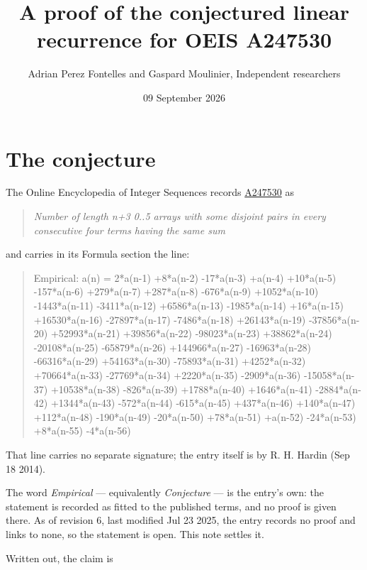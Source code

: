 \documentclass[11pt]{article}
\title{A proof of the conjectured linear recurrence for OEIS A247530}
\author{Adrian Perez Fontelles and Gaspard Moulinier, Independent researchers}
\date{09 September 2026}
\theoremstyle{definition}
\begin{document}
\maketitle
\section{The conjecture}

The Online Encyclopedia of Integer Sequences records \href{https://oeis.org/A247530}{A247530} as

\begin{quote}\itshape Number of length n+3 0..5 arrays with some disjoint pairs in every consecutive four terms having the same sum\end{quote}

and carries in its Formula section the line:

\begin{quote}\ttfamily Empirical: a(n) = 2*a(n-1) +8*a(n-2) -17*a(n-3) +a(n-4) +10*a(n-5) -157*a(n-6) +279*a(n-7) +287*a(n-8) -676*a(n-9) +1052*a(n-10) -1443*a(n-11) -3411*a(n-12) +6586*a(n-13) -1985*a(n-14) +16*a(n-15) +16530*a(n-16) -27897*a(n-17) -7486*a(n-18) +26143*a(n-19) -37856*a(n-20) +52993*a(n-21) +39856*a(n-22) -98023*a(n-23) +38862*a(n-24) -20108*a(n-25) -65879*a(n-26) +144966*a(n-27) -16963*a(n-28) -66316*a(n-29) +54163*a(n-30) -75893*a(n-31) +4252*a(n-32) +70664*a(n-33) -27769*a(n-34) +2220*a(n-35) -2909*a(n-36) -15058*a(n-37) +10538*a(n-38) -826*a(n-39) +1788*a(n-40) +1646*a(n-41) -2884*a(n-42) +1344*a(n-43) -572*a(n-44) -615*a(n-45) +437*a(n-46) +140*a(n-47) +112*a(n-48) -190*a(n-49) -20*a(n-50) +78*a(n-51) +a(n-52) -24*a(n-53) +8*a(n-55) -4*a(n-56)\end{quote}

That line carries no separate signature; the entry itself is by R. H. Hardin (Sep 18 2014).

The word {\itshape Empirical} --- equivalently {\itshape Conjecture} --- is the entry's own: the statement is recorded as fitted to the published terms, and no proof is given there. As of revision 6, last modified Jul 23 2025, the entry records no proof and links to none, so the statement is open. This note settles it.

Written out, the claim is
\end{document}
